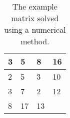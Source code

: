 \documentclass[10pt]{article}
\begin{document}
\begin{table}[]
\centering
\begin{tabular}{|l|l|l|l|}
\hline
3 & 5  & 8  & 16 \\ \hline
2 & 5  & 3  & 10 \\ \hline
3 & 7  & 2  & 12 \\ \hline
8 & 17 & 13 &    \\ \hline
\end{tabular}
\caption{The example matrix solved using a numerical method.}
\label{tab:matrixsolved}
\end{table}


\nocite{*}

\end{document}
